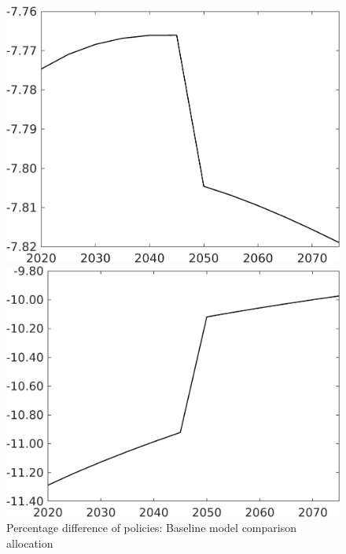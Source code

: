 \documentclass[12pt]{article}
\begin{document}
\begin{figure}[h!!]
	\centering
	\caption{Percentage difference of policies: Baseline model comparison allocation}\label{fig:Pertauf_nsk1_xgr02}
	
	\begin{minipage}[]{0.32\textwidth}
		\includegraphics[width=1\textwidth]{../../codding_model/own_basedOnFried/optimalPol_010922_revision/figures/all_13Sept22/CompTaufPER_bytaul_Reg0_N_spillover0_nsk1_xgr0_knspil0_sep0_LFlimit1_emsbase0_countec0_GovRev0_etaa0.79_lgd0.png}
	\end{minipage}	
	\begin{minipage}[]{0.32\textwidth}
		\includegraphics[width=1\textwidth]{../../codding_model/own_basedOnFried/optimalPol_010922_revision/figures/all_13Sept22/CompTaufPER_bytaul_Reg0_G_spillover0_nsk1_xgr0_knspil0_sep0_LFlimit1_emsbase0_countec0_GovRev0_etaa0.79_lgd0.png}

\end{minipage}
\end{figure}
\end{document}
